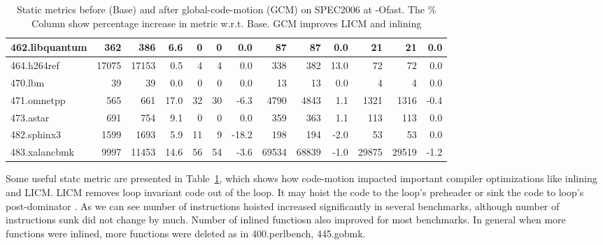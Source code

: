 \documentclass[acmlarge,review,anonymous]{acmart}\settopmatter{printfolios=true}
\begin{document}
\begin{table}[h!]
\begin{center}
\begin{tabular}{|l|r|r|r|r|r|r|r|r|r|r|r|r|}
 462.libquantum	  & 362	        & 386	& 6.6 & 0 	& 0	& 0.0  & 87	& 87	  & 0.0 & 21	& 21	& 0.0  \\\hline
 464.h264ref	  & 17075	& 17153	& 0.5 & 4	& 4	& 0.0  & 338	& 382	  & 13.0& 72	& 72	& 0.0  \\\hline
 470.lbm	  & 39	        & 39	& 0.0 & 0	& 0	& 0.0  & 13	& 13	  & 0.0 & 4	& 4	& 0.0  \\\hline
 471.omnetpp	  & 565	        & 661	& 17.0& 32	& 30	& -6.3 & 4790	& 4843	  & 1.1 & 1321	& 1316	& -0.4 \\\hline
 473.astar	  & 691	        & 754	& 9.1 & 0	& 0	& 0.0  & 359	& 363	  & 1.1 & 113	& 113	& 0.0  \\\hline
 482.sphinx3	  & 1599	& 1693	& 5.9 & 11	& 9	& -18.2& 198	& 194	  & -2.0& 53	& 53	& 0.0  \\\hline
 483.xalancbmk	  & 9997	& 11453	& 14.6& 56	& 54	& -3.6 & 69534	& 68839	  & -1.0& 29875	& 29519	& -1.2 \\\hline
    \end{tabular}
  \end{center}
  \caption{Static metrics before (Base) and after global-code-motion (GCM) on SPEC2006 at -Ofast. The \% Column show percentage increase in metric w.r.t. Base. GCM improves LICM and inlining}
  \label{tab:stats}
\end{table}

Some useful statc metric are presented in Table~\ref{tab:stats}, which shows how code-motion
impacted important compiler optimizations like inlining and LICM. LICM removes loop invariant
code out of the loop. It may hoist the code to the loop's preheader or sink the code to loop's
post-dominator \cite{steven1997advanced}. As we can see number of instructions hoisted increased
significantly in several benchmarks, although number of instructions sunk did not change by much.
Number of inlined functiosn also improved for most benchmarks. In general when more functions
were inlined, more functions were deleted as in 400.perlbench, 445.gobmk.
\end{document}
